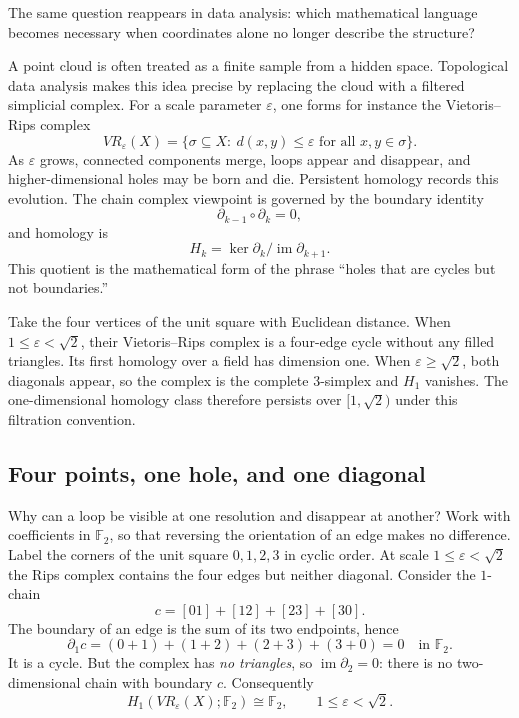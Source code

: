 The same question reappears in data analysis: which mathematical language becomes necessary when coordinates alone no longer describe the structure?

A point cloud is often treated as a finite sample from a hidden space.  Topological data analysis makes this idea precise by replacing the cloud with a filtered simplicial complex.  For a scale parameter $\varepsilon$, one forms for instance the Vietoris--Rips complex
\[
  VR_\varepsilon(X)=\{\sigma\subseteq X:\ d(x,y)\le \varepsilon\text{ for all }x,y\in \sigma\}.
\]
As $\varepsilon$ grows, connected components merge, loops appear and disappear, and higher-dimensional holes may be born and die.  Persistent homology records this evolution.  The chain complex viewpoint is governed by the boundary identity
\[
  \partial_{k-1}\circ \partial_k=0,
\]
and homology is
\[
  H_k=\ker \partial_k/\operatorname{im}\partial_{k+1}.
\]
This quotient is the mathematical form of the phrase ``holes that are cycles but not boundaries.''

\begin{example}
Take the four vertices of the unit square with Euclidean distance. When $1\le\varepsilon<\sqrt2$, their Vietoris--Rips complex is a four-edge cycle without any filled triangles. Its first homology over a field has dimension one. When $\varepsilon\ge\sqrt2$, both diagonals appear, so the complex is the complete $3$-simplex and $H_1$ vanishes. The one-dimensional homology class therefore persists over $[1,\sqrt2)$ under this filtration convention.
\end{example}

\subsection*{Four points, one hole, and one diagonal}

Why can a loop be visible at one resolution and disappear at another? Work with coefficients in $\mathbb F_2$, so that reversing the orientation of an edge makes no difference. Label the corners of the unit square $0,1,2,3$ in cyclic order. At scale $1\le\varepsilon<\sqrt2$ the Rips complex contains the four edges but neither diagonal. Consider the $1$-chain
\[
 c=[01]+[12]+[23]+[30].
\]
The boundary of an edge is the sum of its two endpoints, hence
\[
 \partial_1c=(0+1)+(1+2)+(2+3)+(3+0)=0
 \quad\text{in }\mathbb F_2.
\]
It is a cycle. But the complex has \emph{no triangles}, so $\operatorname{im}\partial_2=0$: there is no two-dimensional chain with boundary $c$. Consequently
\[
 \boxed{H_1(VR_\varepsilon(X);\mathbb F_2)
       \cong\mathbb F_2,\qquad1\le\varepsilon<\sqrt2.}
\]

